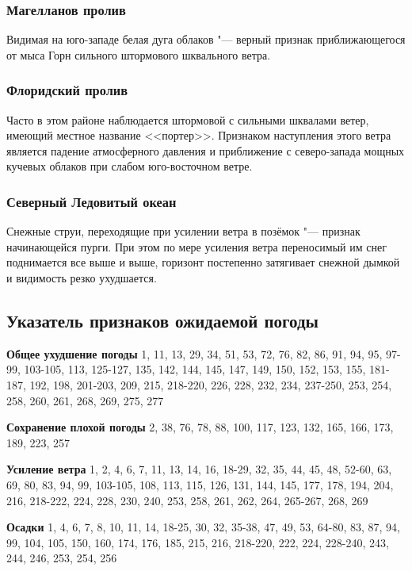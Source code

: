 \subsubsection{Магелланов пролив}

Видимая на юго-западе белая дуга облаков "--- верный признак
приближающегося от мыса Горн сильного штормового шквального ветра.

\subsubsection{Флоридский пролив}

Часто в этом районе наблюдается штормовой с сильными шквалами ветер,
имеющий местное название <<портер>>. Признаком наступления этого ветра
является падение атмосферного давления и приближение с северо-запада
мощных кучевых облаков при слабом юго-восточном ветре.

\subsubsection{Северный Ледовитый океан}

Снежные струи, переходящие при усилении ветра в позёмок "--- признак
начинающейся пурги. При этом по мере усиления ветра переносимый им
снег поднимается все выше и выше, горизонт постепенно затягивает
снежной дымкой и видимость резко ухудшается.

\clearpage
\subsection{Указатель признаков ожидаемой погоды}
\textbf{Общее ухудшение погоды} 1, 11, 13, 29, 34, 51, 53, 72, 76, 82, 86, 91, 94, 95, 97-99, 103-105, 113, 125-127, 135, 142, 144, 145, 147, 149, 150, 152, 153, 155, 181-187, 192, 198, 201-203, 209, 215, 218-220, 226, 228, 232, 234, 237-250, 253, 254, 258, 260, 261, 268, 269, 275, 277

\textbf{Сохранение плохой погоды} 2, 38, 76, 78, 88, 100, 117, 123,
132, 165, 166, 173, 189, 223, 257

\textbf{Усиление ветра} 1, 2, 4, 6, 7, 11, 13, 14, 16, 18-29, 32, 35,
44, 45, 48, 52-60, 63, 69, 80, 83, 94, 99, 103-105, 108, 113, 115,
126, 131, 144, 145, 177, 178, 194, 204, 216, 218-222, 224, 228, 230,
240, 253, 258, 261, 262, 264, 265-267, 268, 269

\textbf{Осадки} 1, 4, 6, 7, 8, 10, 11, 14, 18-25, 30, 32, 35-38, 47,
49, 53, 64-80, 83, 87, 94, 99, 104, 105, 150, 160, 174, 176, 185, 215,
216, 218-220, 222, 224, 228-240, 243, 244, 246, 253, 254, 256

